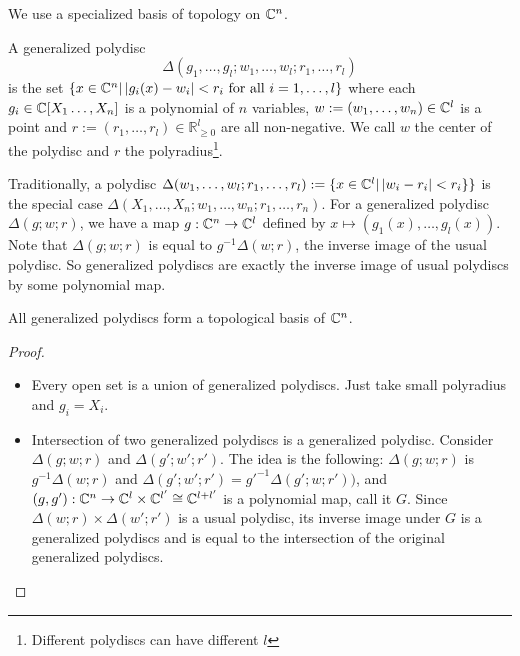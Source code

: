 We use a specialized basis of topology on $\mathbb{C}^{n}$.
\begin{definition}\label{def:generalized-polydisc}
  A generalized polydisc
  \[\Delta(g_{1},\dots,g_{l}; w_{1},\dots, w_{l}; r_{1},\dots, r_{l})\]
  is the set $\left\{x \in \mathbb{C}^{n}| \left|g_{i}(x) - w_{i}\right| < r_{i}~\text{for all}~i = 1,\dots,l \right\}$ where each $g_{i} \in \mathbb{C}[X_{1}\dots,X_{n}]$ is a polynomial of $n$ variables, $w := (w_{1},\dots, w_{n}) \in \mathbb{C}^{l}$ is a point and $r := (r_{1},\dots,r_{l})\in\mathbb{R}^{l}_{\ge0}$ are all non-negative. We call $w$ the center of the polydisc and $r$  the polyradius\footnote{Different polydiscs can have different $l$}.
\end{definition}

\begin{remark}
	Traditionally, a polydisc $\Delta(w_{1},\dots, w_{l}; r_{1},\dots,r_{l}) := \{x \in \mathbb{C}^{l}| \left|w_{i}-r_{i}\right| < r_{i}\}\}$ is the special case $\Delta(X_{1},\dots,X_{n};w_{1},\dots,w_{n}; r_{1},\dots, r_{n})$. For a generalized polydisc $\Delta(g; w; r)$, we have a map $g : \mathbb{C}^{n}\to\mathbb{C}^{l}$ defined by $x \mapsto (g_{1}(x),\dots,g_{l}(x))$. Note that $\Delta(g; w; r)$ is equal to $g^{-1}\Delta(w; r)$, the inverse image of the usual polydisc. So generalized polydiscs are exactly the inverse image of usual polydiscs by some polynomial map.
\end{remark}

\begin{lemma}
	All generalized polydiscs form a topological basis of $\mathbb{C}^{n}$.
\end{lemma}
\begin{proof}
	\begin{itemize}
		\item Every open set is a union of generalized polydiscs. Just take small polyradius and $g_{i} = X_{i}$.
		\item Intersection of two generalized polydiscs is a generalized polydisc. Consider $\Delta(g; w; r)$ and $\Delta(g'; w'; r')$. The idea is the following: $\Delta(g; w; r)$ is $g^{-1}\Delta(w; r)$ and $\Delta(g'; w'; r') = {g'}^{-1}\Delta(g'; w; r'))$, and $(g, g'): \mathbb{C}^{n} \to \mathbb{C}^{l}\times\mathbb{C}^{l'}\cong \mathbb{C}^{l + l'}$ is a polynomial map, call it $G$. Since $\Delta(w; r) \times \Delta(w'; r')$ is a usual polydisc, its inverse image under $G$ is a generalized polydiscs and is equal to the intersection of the original generalized polydiscs.
	\end{itemize}
\end{proof}

